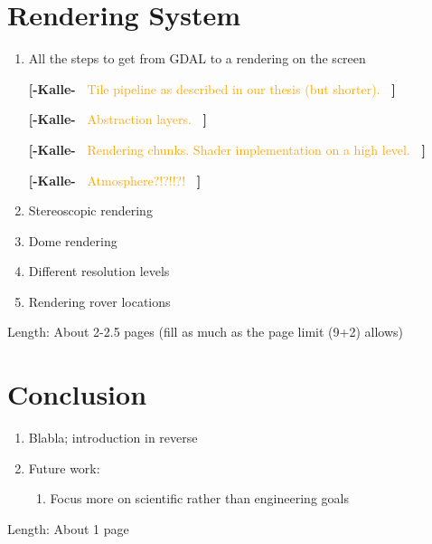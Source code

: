 \documentclass[journal]{vgtc}                %
\newcommand{\kallecomment}[1]{\textbf{[-Kalle-~}
    \textcolor{orange}{#1}
    \textbf{~]}}
\begin{document}
\section{Rendering System} \label{sec:renderingsystem}
\begin{enumerate}
  \item All the steps to get from GDAL to a rendering on the screen
  
  \kallecomment{Tile pipeline as described in our thesis (but shorter).}
  
  \kallecomment{Abstraction layers.}
  
  \kallecomment{Rendering chunks. Shader implementation on a high level.}
  
  \kallecomment{Atmosphere?!?!!?!}
  
  \item Stereoscopic rendering
  \item Dome rendering
  \item Different resolution levels
  \item Rendering rover locations
\end{enumerate}
Length: About 2-2.5 pages (fill as much as the page limit (9+2) allows)

\section{Conclusion} \label{sec:system}
\begin{enumerate}
  \item Blabla; introduction in reverse
  \item Future work:
  \begin{enumerate}
    \item Focus more on scientific rather than engineering goals
  \end{enumerate}
\end{enumerate}
Length: About 1 page


%

%
%
%


\end{document}
